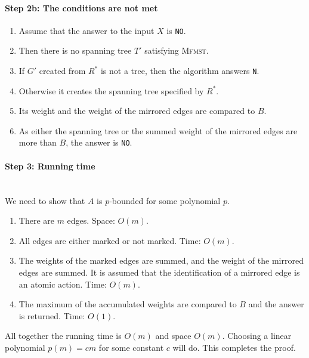 \paragraph{Step 2b: The conditions are not met} \mbox{}
\begin{enumerate}
    \item Assume that the answer to the input $X$ is \verb=NO=.
    \item Then there is no spanning tree $T'$ satisfying \textsc{Mfmst}.
    \item If $G'$ created from $R^*$ is not a tree, then the algorithm answers \verb=N=.
    \item Otherwise it creates the spanning tree specified by $R^*$.
    \item Its weight and the weight of the mirrored edges are compared to $B$.
    \item As either the spanning tree or the summed weight of the mirrored edges are more than $B$, the answer is \verb=NO=. 
\end{enumerate}

\paragraph{Step 3: Running time} \mbox{} \\
We need to show that $A$ is $p$-bounded for some polynomial $p$.
\begin{enumerate}
    \item There are $m$ edges. Space: $O(m)$.
    \item All edges are either marked or not marked. Time: $O(m)$.
    \item The weights of the marked edges are summed, and the weight of the mirrored edges are summed. It is assumed that the identification of a mirrored edge is an atomic action. Time: $O(m)$.
    \item The maximum of the accumulated weights are compared to $B$ and the answer is returned. Time: $O(1)$.
\end{enumerate}
All together the running time is $O(m)$ and space $O(m)$. Choosing a linear polynomial $p(m) = cm$ for some constant $c$ will do. 
\newline \newline
This completes the proof.